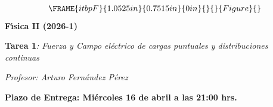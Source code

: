 \documentclass[onecolumn]{article}
\begin{document}
\begin{center}
\begin{equation*}
\FRAME{itbpF}{1.0525in}{0.7515in}{0in}{}{}{Figure}{\special{language
"Scientific Word";type "GRAPHIC";maintain-aspect-ratio TRUE;display
"USEDEF";valid_file "T";width 1.0525in;height 0.7515in;depth
0in;original-width 2.3168in;original-height 1.6466in;cropleft "0";croptop
"1";cropright "1";cropbottom "0";tempfilename
'TCTQIQ04.bmp';tempfile-properties "XPR";}}
\end{equation*}%
\textbf{F\'{\i}sica II (2026-1)}

\textbf{Tarea 1}\emph{: Fuerza y Campo el\'{e}ctrico de cargas puntuales y
distribuciones continuas}

\textit{Profesor: Arturo Fern\'{a}ndez P\'{e}rez}

\textbf{Plazo de Entrega: Mi\'{e}rcoles 16 de abril a las 21:00 hrs.}
\end{center}
\end{document}
